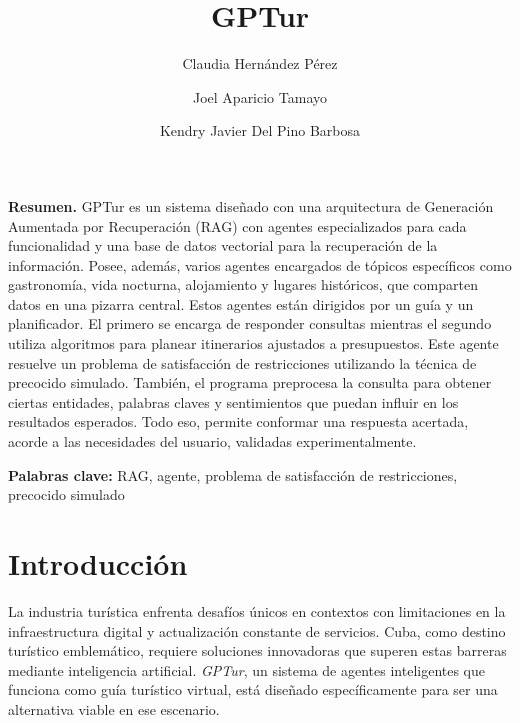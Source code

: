 \documentclass[10pt]{llncs}
\renewenvironment{abstract}{%
  \small
  \begin{list}{}{%
    \setlength{\leftmargin}{1cm}%
    \setlength{\rightmargin}{1cm}%
  }
  \item\relax\ignorespaces}
  {\end{list}\vspace{2\baselineskip}}
\begin{document}
\title{GPTur}



\author{
  Claudia Hernández Pérez \and
  Joel Aparicio Tamayo \and
  Kendry Javier Del Pino Barbosa
}



\maketitle

\begin{abstract} \textbf{Resumen.}
GPTur es un sistema diseñado con una arquitectura de Generación Aumentada por Recuperación (RAG) con agentes especializados para cada funcionalidad y una base de datos 
vectorial para la recuperación de la información. Posee, además, varios agentes encargados de tópicos específicos como gastronomía, 
vida nocturna, alojamiento y lugares históricos, que comparten datos en una pizarra central. Estos 
agentes están dirigidos por un guía y un planificador. El primero se encarga de responder consultas mientras el segundo utiliza algoritmos para planear 
itinerarios ajustados a presupuestos. Este agente resuelve un problema de satisfacción de restricciones utilizando la técnica de precocido simulado. También, el programa 
preprocesa la consulta para obtener ciertas entidades, palabras claves y sentimientos que puedan influir en los resultados esperados. Todo eso, permite conformar una respuesta acertada, 
acorde a las necesidades del usuario, validadas experimentalmente.
\par
\vspace{2\baselineskip}
\textbf{Palabras clave:} RAG, agente, problema de satisfacción de restricciones, precocido simulado
\end{abstract}

\section{Introducción}\label{sec:intro}
La industria turística enfrenta desafíos únicos en contextos con limitaciones en la infraestructura digital y 
actualización constante de servicios. Cuba, como destino turístico emblemático, requiere soluciones 
innovadoras que superen estas barreras mediante inteligencia artificial. \textit{GPTur}, 
un sistema de agentes inteligentes que funciona como guía turístico virtual, está diseñado específicamente 
para ser una alternativa viable en ese escenario.
\end{document}
